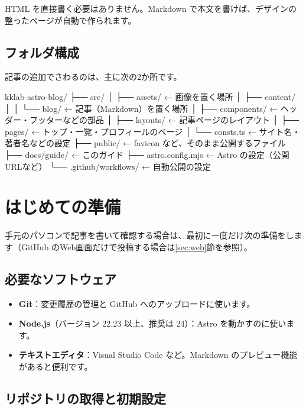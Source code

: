 \documentclass[a4paper,11pt]{ltjsarticle}
\begin{document}
HTML を直接書く必要はありません。Markdown で本文を書けば、デザインの整ったページが自動で作られます。

\subsection{フォルダ構成}

記事の追加でさわるのは、主に次の2か所です。

\begin{code}
kklab-astro-blog/
├── src/
│   ├── assets/          ← 画像を置く場所
│   ├── content/
│   │   └── blog/        ← 記事（Markdown）を置く場所
│   ├── components/      ← ヘッダー・フッターなどの部品
│   ├── layouts/         ← 記事ページのレイアウト
│   ├── pages/           ← トップ・一覧・プロフィールのページ
│   └── consts.ts        ← サイト名・著者名などの設定
├── public/              ← favicon など、そのまま公開するファイル
├── docs/guide/          ← このガイド
├── astro.config.mjs     ← Astro の設定（公開URLなど）
└── .github/workflows/   ← 自動公開の設定
\end{code}

\section{はじめての準備}\label{sec:prep}

手元のパソコンで記事を書いて確認する場合は、最初に一度だけ次の準備をします（GitHub のWeb画面だけで投稿する場合は\ref{sec:web}節を参照）。

\subsection{必要なソフトウェア}

\begin{itemize}
  \item \textbf{Git}：変更履歴の管理と GitHub へのアップロードに使います。
  \item \textbf{Node.js}（バージョン 22.23 以上、推奨は 24）：Astro を動かすのに使います。
  \item \textbf{テキストエディタ}：Visual Studio Code など。Markdown のプレビュー機能があると便利です。
\end{itemize}

\subsection{リポジトリの取得と初期設定}
\end{document}

